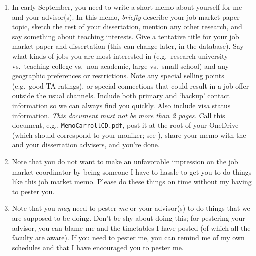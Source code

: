 \documentclass{\classes/econtex}
\begin{document}
\begin{enumerate}
  \hypertarget{write-and-post-memo}{}
\item {} In early September, you need to write a short memo about yourself for me and your advisor(s).  In this memo, \textit{briefly} describe your job market paper topic, sketch the rest of your dissertation, mention any other research, and say something about teaching interests.  Give a tentative title for your job market paper and dissertation (this can change later, in the database).  Say what kinds of jobs you are most interested in (e.g.\ research university vs.\ teaching college vs.\ non-academic, large vs.\ small school) and any geographic preferences or restrictions.  Note any special selling points (e.g.\ good TA ratings), or special connections that could result in a job offer outside the usual channels.  Include both primary and `backup' contact information so we can always find you quickly.  Also include visa status information.  \textit{This document must not be more than 2 pages.}  Call this document, e.g., \texttt{MemoCarrollCD.pdf}, post it at the root of your OneDrive (which should correspond to your moniker; see \ntn), share your memo with the \JMPO and your dissertation advisers, and you're done.

\item Note that you do not want to make an unfavorable impression on
  the job market coordinator by being someone I have to hassle to get
  you to do things like this job market memo.  Please do these things
  on time without my having to pester you.

  \hypertarget{Pester}{}
\item Note that you \textit{may} need to pester \textit{me} or your advisor(s) to do things
  that we are supposed to be doing.  Don't be shy about doing this; for pestering
  your advisor, you can blame me and the timetables I have posted (of which all the
  faculty are aware).  If you need to pester me, you can remind me of my own
  schedules and that I have encouraged you to pester me.


\end{enumerate}
\end{document}

